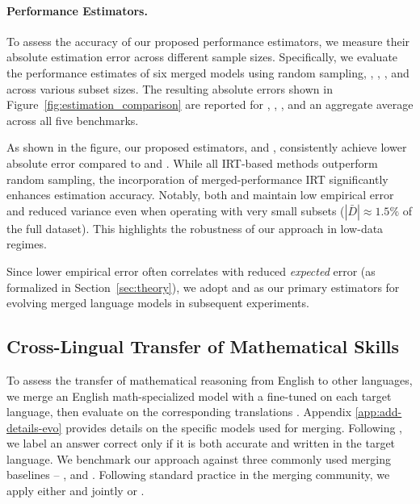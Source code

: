 \paragraph{Performance Estimators.} \label{par: pe}
%
To assess the accuracy of our proposed performance estimators, we measure their absolute estimation error across different sample sizes. Specifically, we evaluate the performance estimates of six merged models using random sampling, \pirt{}, \gpirt{} \cite{tinybenchmarks}, \mpirt{}, and \gmpirt{} across various subset sizes. The resulting absolute errors shown in Figure~\ref{fig:estimation_comparison} are reported for , , , and an aggregate average across all five benchmarks.


As shown in the figure, our proposed estimators, \mpirt{} and \gmpirt{}, consistently achieve lower absolute error compared to \gpirt{} and \pirt{}. While all IRT-based methods outperform random sampling, the incorporation of merged-performance IRT significantly enhances estimation accuracy. Notably, both \mpirt{} and \gmpirt{} maintain low empirical error and reduced variance even when operating with very small subsets (\(|\bar{D}| \approx 1.5\%\) of the full dataset). This highlights the robustness of our approach in low-data regimes. 

Since lower empirical error often correlates with reduced \emph{expected} error (as formalized in Section~\ref{sec:theory}), we adopt \mpirt{} and \gmpirt{} as our primary estimators for evolving merged language models in subsequent experiments.

\subsection{Cross-Lingual Transfer of Mathematical Skills}
\label{sec: cross-lingual}
To assess the transfer of mathematical reasoning from English to other languages, we merge an English math-specialized model with a  \cite{mistral} fine-tuned on each target language, then evaluate on the corresponding  translations \citep{gsm8k}. Appendix \ref{app:add-details-evo} provides details on the specific models used for merging. Following \citet{sakana}, we label an answer correct only if it is both accurate and written in the target language. We benchmark our approach against three commonly used merging baselines --  \citep{task-vectors},  \citep{ties} and  \citep{yu2024language}. Following standard practice in the merging community, we apply either  and  jointly or  \cite{10.1145/325165.325242}.

